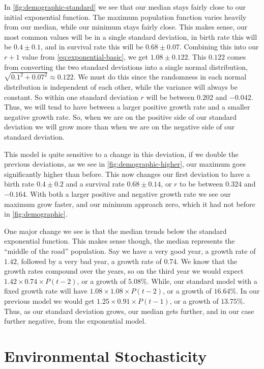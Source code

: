 \documentclass{article}
\begin{document}
In \cref{fig:demographic-standard} we see that our median stays fairly close to our initial exponential function. The maximum population function varies heavily from our median, while our minimum stays fairly close. This makes sense, our most common values will be in a single standard deviation, in birth rate this will be $0.4 \pm 0.1$, and in survival rate this will be $0.68 \pm 0.07$. Combining this into our $r + 1$ value from \cref{eq:exponential-basic}, we get $1.08 \pm 0.122$. This $0.122$ comes from converting the two standard deviations into a single normal distribution, $\sqrt{0.1^2+0.07^2} \approx 0.122$. We must do this since the randomness in each normal distribution is independent of each other, while the variance will always be constant. So within one standard deviation $r$ will be between $0.202$ and $-0.042$. Thus, we will tend to have between a larger positive growth rate and a smaller negative growth rate. So, when we are on the positive side of our standard deviation we will grow more than when we are on the negative side of our standard deviation.

This model is quite sensitive to a change in this deviation, if we double the previous deviations, as we see in \cref{fig:demographic-higher}, our maximum goes significantly higher than before. This now changes our first deviation to have a birth rate $0.4 \pm 0.2$ and a survival rate $0.68 \pm 0.14$, or $r$ to be between $0.324$ and $-0.164$. With both a larger positive and negative growth rate we see our maximum grow faster, and our minimum approach zero, which it had not before in \cref{fig:demographic}.

One major change we see is that the median trends below the standard exponential function. This makes sense though, the median represents the ``middle of the road'' population. Say we have a very good year, a growth rate of $1.42$, followed by a very bad year, a growth rate of $0.74$. We know that the growth rates compound over the years, so on the third year we would expect $1.42 \times 0.74 \times P(t-2)$, or a growth of $5.08\%$. While, our standard model with a fixed growth rate will have $1.08 \times 1.08 \times P(t-2)$, or a growth of $16.64\%$. In our previous model we would get $1.25 \times 0.91 \times P(t-1)$, or a growth of $13.75\%$. Thus, as our standard deviation grows, our median gets further, and in our case further negative, from the exponential model.


\section{Environmental Stochasticity}
\end{document}
